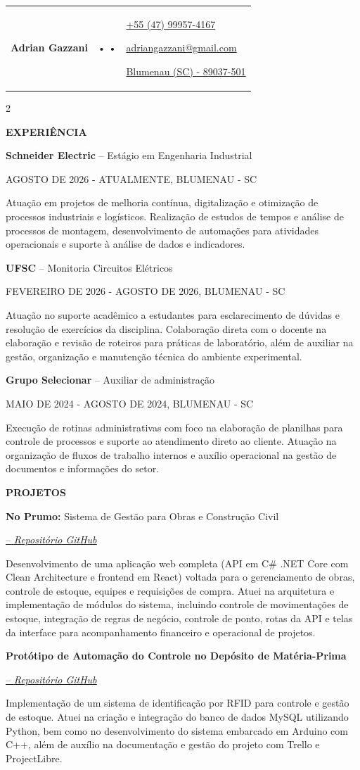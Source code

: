 \documentclass[10pt,a4paper]{article}
\makeatletter
\newcommand{\cvheader}{%
  \noindent
  \begin{tabular*}{\textwidth}{@{}
  m{0.56\textwidth}@{\extracolsep{\fill}}
  m{0.20\textwidth}@{}
  m{0.24\textwidth}@{}}
    {\color{TitleBlack}\rmfamily\bfseries\fontsize{36pt}{36pt}\selectfont Adrian Gazzani} &
    
    {\fontsize{15pt}{15pt}\selectfont
      \color{LinkedIn}\href{https://www.linkedin.com/in/adriangazzani}{\faLinkedin} \color{ContactOrange}•
      \color{TitleBlack}\href{https://github.com/adrianfelsky}{\faGithub} \color{ContactOrange}•
      \color{Portfolio}\href{https://adrianfelsky.github.io/adrianfelsky/}{\faGlobe}
    } &
    
    {\color{ContactOrange}\sffamily\fontsize{8pt}{8pt}\selectfont
      \href{https://wa.me/5547999574167}{+55 (47) 99957-4167}\par
      \href{mailto:adriangazzani@gmail.com}{adriangazzani@gmail.com}\par
      \href{https://www.google.com/maps/place/89037-501}{Blumenau (SC) - 89037-501}
    }
  \end{tabular*}
  \vspace{5pt}
}
\newcommand{\titulo}[1]{
    \vspace{7pt}%
    {\noindent\sffamily\bfseries\fontsize{10pt}{10pt}\selectfont\textcolor{HeadingBlue}{#1}\par}
}
\newcommand{\subtitulo}[2]{
  \vspace{7pt}%
  {\noindent\rmfamily\fontsize{11pt}{12pt}\selectfont\textcolor{TitleBlack}{\textbf{#1}\textnormal{ #2}}\par}%
}
\newcommand{\data}[1]{
  \vspace{5pt}
  {\noindent\sffamily\fontsize{8pt}{9pt}\selectfont\textcolor{BodyGrey}{#1}\par}%
}
\newcommand{\textonormal}[2]{
  \vspace{5pt}%
  {\noindent\rmfamily\fontsize{9pt}{12pt}\selectfont\textcolor{BodyGrey}{\textbf{#1} #2}\par}%
}
\newcommand{\projectlink}[2]{
  \href{#1}{-- \textcolor{LinkBlue}{\normalfont\itshape\fontsize{11pt}{12pt}\selectfont\uline{#2}}}\par
}
\newcommand{\cvsection}[1]{%
  \titulo{#1}%
}
\newcommand{\cventry}[4]{%
  \subtitulo{#1}{-- #2}
  \data{#3}
  \textonormal{}{#4}
}
\newcommand{\cvproject}[5]{%
  \begingroup
  \let\par\relax %
  \subtitulo{#1}{#2}%
  \projectlink{#3}{#4}%
  \endgroup\par %
  \textonormal{}{#5}
}
\makeatother
\begin{document}
\raggedright

\cvheader

\begin{paracol}{2}

\cvsection{EXPERIÊNCIA}

\cventry{Schneider Electric}{Estágio em Engenharia Industrial}{AGOSTO DE 2026 - ATUALMENTE, BLUMENAU - SC}{%
  Atuação em projetos de melhoria contínua, digitalização e otimização de processos industriais e logísticos. Realização de estudos de tempos e análise de processos de montagem, desenvolvimento de automações para atividades operacionais e suporte à análise de dados e indicadores.%
}

\cventry{UFSC}{Monitoria Circuitos Elétricos}{FEVEREIRO DE 2026 - AGOSTO DE 2026, BLUMENAU - SC}{%
  Atuação no suporte acadêmico a estudantes para esclarecimento de dúvidas e resolução de exercícios da disciplina. Colaboração direta com o docente na elaboração e revisão de roteiros para práticas de laboratório, além de auxiliar na gestão, organização e manutenção técnica do ambiente experimental.%
}

\cventry{Grupo Selecionar}{Auxiliar de administração}{MAIO DE 2024 - AGOSTO DE 2024, BLUMENAU - SC}{%
  Execução de rotinas administrativas com foco na elaboração de planilhas para controle de processos e suporte ao atendimento direto ao cliente. Atuação na organização de fluxos de trabalho internos e auxílio operacional na gestão de documentos e informações do setor.%
}

\cvsection{PROJETOS}

\cvproject{No Prumo:}{Sistema de Gestão para Obras e Construção Civil}{https://github.com/GabrielHenriqueCe/NoPrumo.git}{Repositório GitHub}{%
  Desenvolvimento de uma aplicação web completa (API em C\# .NET Core com Clean Architecture e frontend em React) voltada para o gerenciamento de obras, controle de estoque, equipes e requisições de compra. Atuei na arquitetura e implementação de módulos do sistema, incluindo controle de movimentações de estoque, integração de regras de negócio, controle de ponto, rotas da API e telas da interface para acompanhamento financeiro e operacional de projetos.%
}

\cvproject{Protótipo de Automação do Controle no Depósito de Matéria-Prima}{}{https://github.com/adrianfelsky/gestao-de-estoque-rfid/tree/patch-1}{Repositório GitHub}{%
  Implementação de um sistema de identificação por RFID para controle e gestão de estoque. Atuei na criação e integração do banco de dados MySQL utilizando Python, bem como no desenvolvimento do sistema embarcado em Arduino com C++, além de auxílio na documentação e gestão do projeto com Trello e ProjectLibre.%
}


\end{paracol}
\end{document}
